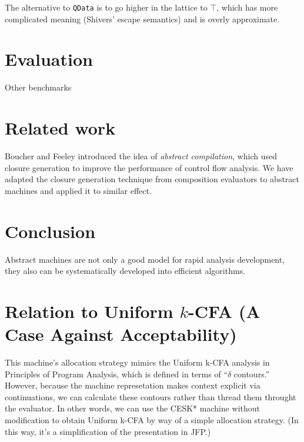 \documentclass[preprint]{sigplanconf}
\begin{document}
The alternative to {\tt QData} is to go higher in the lattice to
$\top$, which has more complicated meaning (Shivers' escape semantics) and
is overly approximate.

\section{Evaluation}

\cite{dvanhorn:Earl2012Introspective}

\cite{dvanhorn:wright-jagannathan-toplas98}

Other benchmarks

\section{Related work}

Boucher and Feeley \cite{dvanhorn:Boucher1996Abstract} introduced the
idea of \emph{abstract compilation}, which used closure generation
\cite{dvanhorn:Feeley1987Using} to improve the performance of control
flow analysis.  We have adapted the closure generation technique from
composition evaluators to abstract machines and applied it to similar
effect.

\section{Conclusion}

Abstract machines are not only a good model for rapid analysis
development, they also can be systematically developed into efficient
algorithms.




\appendix
\section{Relation to Uniform \(k\)-CFA (A Case Against Acceptability)}

\cite{dvanhorn:nielson-nielson-popl97} \cite{dvanhorn:Neilson:1999}

This machine's allocation strategy mimics the Uniform k-CFA analysis
in Principles of Program Analysis, which is defined in terms of
``$\delta$ contours.''  However, because the machine represetation makes
context explicit via continuations, we can calculate these contours
rather than thread them throught the evaluator.  In other words, we
can use the CESK* machine without modification to obtain Uniform k-CFA
by way of a simple allocation strategy.  (In this way, it's a
simplification of the presentation in JFP.)
\end{document}

